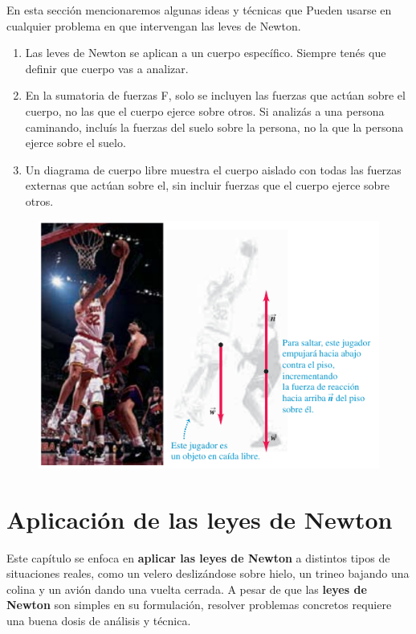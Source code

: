\documentclass{article}
\newcommand{\newsection}[1]{
    \section{\centering \color{sectionColor} \bl{#1}}
}
\newcommand{\bl}[1]{\textbf{#1}}
\begin{document}
    \par En esta sección mencionaremos algunas ideas y técnicas que Pueden usarse en cualquier problema en que intervengan las leves de Newton.

    \begin{enumerate}
        \item Las leves de Newton se aplican a un cuerpo específico. Siempre tenés que definir que cuerpo vas a analizar.
        \item En la sumatoria de fuerzas F, solo se incluyen las fuerzas que actúan sobre el cuerpo, no las que el cuerpo ejerce sobre otros. Si analizás a una persona caminando, incluís la fuerzas del suelo sobre la persona, no la que la persona ejerce sobre el suelo.
        \item Un diagrama de cuerpo libre muestra el cuerpo aislado con todas las fuerzas externas que actúan sobre el, sin incluir fuerzas que el cuerpo ejerce sobre otros.
    \end{enumerate}

    \begin{figure}[H]
        \centering
        \includegraphics[scale=0.7]{img/2.6-1.png}
    \end{figure}

\newsection{Aplicación de las leyes de Newton}

\par Este capítulo se enfoca en \bl{aplicar las leyes de Newton} a distintos tipos de situaciones reales, como un velero deslizándose sobre hielo, un trineo bajando una colina y un avión dando una vuelta cerrada. A pesar de que las \bl{leyes de Newton} son simples en su formulación, resolver problemas concretos requiere una buena dosis de análisis y técnica.
\end{document}
